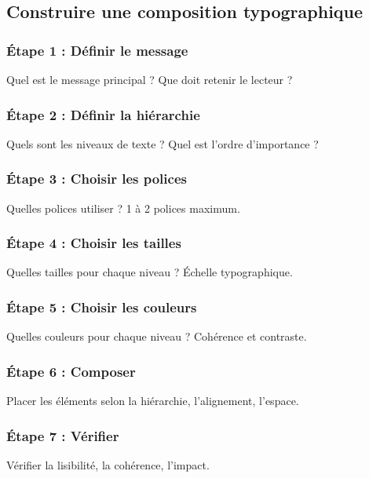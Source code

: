 \subsection{Construire une composition typographique}

\subsubsection{Étape 1 : Définir le message}

Quel est le message principal ? Que doit retenir le lecteur ?

\subsubsection{Étape 2 : Définir la hiérarchie}

Quels sont les niveaux de texte ? Quel est l'ordre d'importance ?

\subsubsection{Étape 3 : Choisir les polices}

Quelles polices utiliser ? 1 à 2 polices maximum.

\subsubsection{Étape 4 : Choisir les tailles}

Quelles tailles pour chaque niveau ? Échelle typographique.

\subsubsection{Étape 5 : Choisir les couleurs}

Quelles couleurs pour chaque niveau ? Cohérence et contraste.

\subsubsection{Étape 6 : Composer}

Placer les éléments selon la hiérarchie, l'alignement, l'espace.

\subsubsection{Étape 7 : Vérifier}

Vérifier la lisibilité, la cohérence, l'impact.

